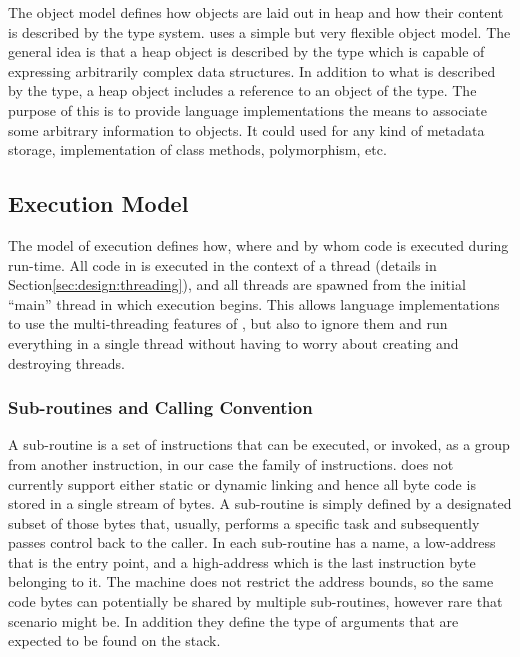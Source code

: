 The object model defines how objects are laid out in heap and how their content
is described by the type system. \thename{} uses a simple but very flexible
object model. The general idea is that a heap object is described by the
 type which is capable of expressing arbitrarily complex data
structures. In addition to what is described by the type, a heap object includes
a reference to an object of the  type. The purpose of this is to
provide language implementations the means to associate some arbitrary
information to objects. It could used for any kind of metadata storage,
implementation of class methods, polymorphism, etc.

\subsection{Execution Model}
\label{sec:design:exec}

The model of execution defines how, where and by whom code is executed during
run-time. All code in \thename{} is executed in the context of a thread (details
in Section\ref{sec:design:threading}), and all threads are spawned from the
initial ``main'' thread in which execution begins. This allows language
implementations to use the multi-threading features of \thename{}, but also to
ignore them and run everything in a single thread without having to worry about
creating and destroying threads.

\subsubsection{Sub-routines and Calling Convention}
\label{sec:design:exec:sub-routine}

A sub-routine is a set of instructions that can be executed, or invoked, as a
group from another instruction, in our case the  family of
instructions. \thename{} does not currently support either static or dynamic
linking and hence all byte code is stored in a single stream of bytes. A
sub-routine is simply defined by a designated subset of those bytes that,
usually, performs a specific task and subsequently passes control back to the
caller. In \thename{} each sub-routine has a name, a low-address that is the
entry point, and a high-address which is the last instruction byte belonging to
it. The machine does not restrict the address bounds, so the same code bytes can
potentially be shared by multiple sub-routines, however rare that scenario might
be. In addition they define the type of arguments that are expected to be found
on the stack.


